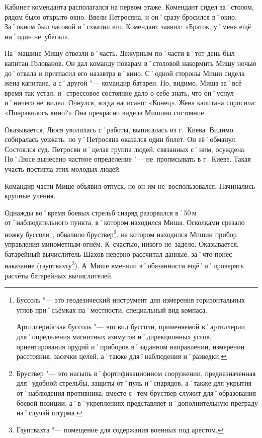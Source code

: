 Кабинет коменданта располагался на первом этаже. Комендант сидел за˚столом, рядом было открыто окно. Ввели Петросяна, и он˚сразу бросился в˚окно. За˚окном был часовой и˚схватил его. Комендант заявил: «Браток, у˚меня ещё ни˚один не~убегал». 

На˚машине Мишу отвезли в˚часть. Дежурным по˚части в˚тот день был капитан Голованов. Он дал команду поварам в˚столовой накормить Мишу ночью до˚отвала и пригласил его назавтра в˚кино. С˚одной стороны Миши сидела жена капитана, а с˚другой "--- командир батареи. Но, видимо, Миша за˚всё время так устал, и˚стрессовое состояние дало о себе знать, что он˚уснул и˚ничего не~видел. Очнулся, когда написано: «Конец». Жена капитана спросила: «Понравилось кино?» Она прекрасно видела Мишино состояние. 

Оказывается, Люся уволилась с˚работы, выписалась из г.~Киева. Видимо собиралась уезжать, но у˚Петросяна оказался один билет. Он её˚обманул. Состоялся суд. Петросян и˚целая группа людей, связанных с˚ним, осуждена. По˚Люсе вынесено частное определение "--- не~прописывать в г.~Киеве. Такая участь постигла этих молодых людей.

Командир части Мише объявил отпуск, но он им не~воспользовался. Начинались крупные учения. 

Однажды во˚время боевых стрельб снаряд разорвался в˚50\,м от˚наблюдательного пункта, в˚котором находился Миша. Осколками срезало ножку буссоли\footnote{Буссоль "--- это геодезический инструмент для измерения горизонтальных углов при˚съёмках на˚местности, специальный вид компаса. 

Артиллерийская буссоль "--- это вид буссоли, применяемой в˚артиллерии для˚определения магнитных азимутов и˚дирекционных углов, ориентирования орудий и˚приборов в˚заданном направлении, измерении расстояния, засечки целей, а˚также для˚наблюдения и˚разведки.}, обвалило бруствер\footnote{Бруствер "--- это насыпь в˚фортификационном сооружении, предназначенная для˚удобной стрельбы, защиты от˚пуль и˚снарядов, а˚также для укрытия от˚наблюдения противника; вместе с˚тем бруствер служит для˚образования боевой позиции, а˚в˚укреплениях представляет и˚дополнительную преграду на˚случай штурма.}, на котором находился Мишин прибор управления минометным огнём. К~счастью, никого не~задело. Оказывается, батарейный вычислитель Шахов неверно рассчитал данные, за˚что понёс наказание (гауптвахту\footnote{Гауптвахта "--- помещение для содержания военных под арестом.}). А~Мише вменили в˚обязанности ещё˚и˚проверять расчёты батарейных вычислителей. 

